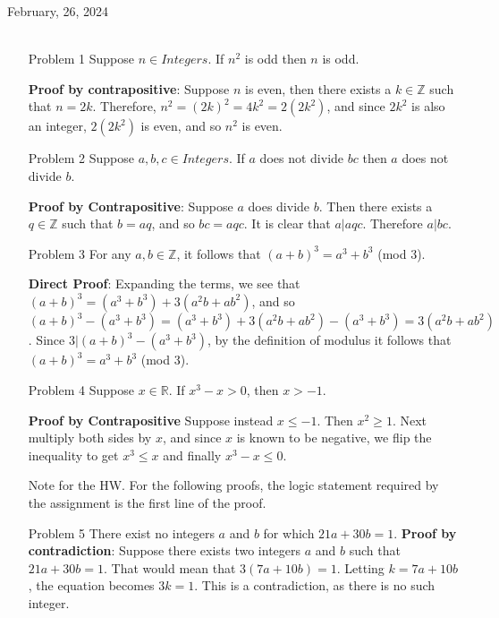 \documentclass[12pt, oneside]{article}
\newcommand{\Reals}{\mathbb{R}}
\newcommand{\Integers}{\mathbb{Z}}
\newcommand{\aandb}{\(a\) and \(b\)}
\begin{document}
\begin{flushleft}
\end{flushleft}
February, 26, 2024\\\\
\begin{itemize}

    \item[Problem 1] Suppose \(n \in Integers\). If \(n^2\) is odd then \(n\) is odd.

          \textbf{Proof by contrapositive}: Suppose \(n\) is even, then there exists a \(k \in \Integers\) such that \(n = 2k\). Therefore, \(n^2 = {(2k)}^2 = 4k^2 = 2(2k^2)\), and since \(2k^2\) is also an integer, \(2(2k^2)\) is even, and so \(n^2\) is even.

    \item[Problem 2] Suppose \(a, b, c \in Integers\). If \(a\) does not divide \(bc\) then \(a\) does not divide \(b\).

          \textbf{Proof by Contrapositive}: Suppose \(a\) does divide \(b\). Then there exists a \(q \in \Integers\) such that \(b = aq\), and so \(bc = aqc\). It is clear that \(a|aqc\). Therefore \(a|bc\).

    \item[Problem 3] For any \(a, b \in \Integers\), it follows that \({(a + b)}^{3} = a^3 + b^3\) (mod 3).

          \textbf{Direct Proof}: Expanding the terms, we see that \({(a + b)}^{3} = (a^3 + b^3) + 3(a^2b+ab^2)\), and so \({(a + b)}^{3} - (a^3 + b^3) = (a^3 + b^3) + 3(a^2b+ab^2) - (a^3 + b^3) = 3(a^2b+ab^2)\). Since \(3|{(a + b)}^{3} - (a^3 + b^3)\), by the definition of modulus it follows that \({(a + b)}^{3} = a^3 + b^3\) (mod 3).

    \item[Problem 4] Suppose \(x \in \Reals\). If \(x^3 - x > 0\), then \(x > -1\).

          \textbf{Proof by Contrapositive} Suppose instead \(x \leq -1\). Then \(x^2 \geq 1\). Next multiply both sides by \(x\), and since \(x\) is known to be negative, we flip the inequality to get \(x^3 \leq x\) and finally \(x^3 - x \leq 0\).

    \item[Note for the HW.] For the following proofs, the logic statement required by the assignment is the first line of the proof.

    \item[Problem 5] There exist no integers \aandb{} for which \(21a + 30b = 1\).
          \textbf{Proof by contradiction}: Suppose there exists two integers \aandb{} such that \(21a + 30b = 1\). That would mean that \(3(7a + 10b) = 1\). Letting \(k = 7a + 10b\), the equation becomes \(3k = 1\). This is a contradiction, as there is no such integer.


\end{itemize}
\end{document}
